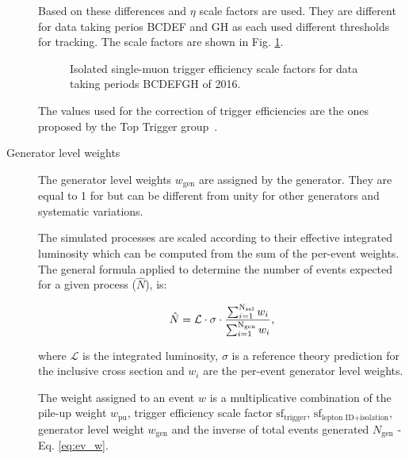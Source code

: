 \begin{description}
Based on these differences \pt and $\eta$ scale factors are used. They are different for data taking perios BCDEF and GH as each used different thresholds for tracking. The scale factors are shown in Fig. \ref{fig:muontriggerssf}.

\begin{figure}[htp]
\centering
  \def\twidth{0.45}
  \centering
\caption{Isolated single-muon trigger efficiency scale factors for data taking periods BCDEFGH of 2016.}
\label{fig:muontriggerssf}
\end{figure}

The values used for the correction of trigger efficiencies are the ones proposed by the Top Trigger group~\cite{twiki:toptrig}.

\item[Generator level weights]

The generator level weights $w_{\text{gen}}$ are assigned by the generator. They are equal to 1 for \POWHEG but can be different from unity for other generators and systematic variations.

The simulated processes are scaled according to their effective integrated luminosity which can be computed from the sum of the per-event weights. The general formula applied to determine the number of events expected for a given process ($\hat{N}$), is:

\begin{equation}
\hat{N}=\mathcal{L}\cdot\sigma\cdot\frac{\sum_{i=1}^{\rm N_{sel}} w_i}{\sum_{i=1}^{\rm N_{gen}} w_i},
\label{eq:genwgts}
\end{equation}

where $\mathcal{L}$ is the integrated luminosity, $\sigma$ is a reference theory prediction for the inclusive cross section and $w_i$ are the per-event generator level weights.

The weight assigned to an event $w$ is a multiplicative combination of the pile-up weight $w_{\text{pu}}$, trigger efficiency scale factor $\text{sf}_{\text{trigger}}$, $\text{sf}_{\text{lepton\ ID+isolation}}$, generator level weight $w_{\text{gen}}$ and the inverse of total events generated $N_{\text{gen}}$ - Eq. \ref{eq:ev_w}. 


\end{description}
